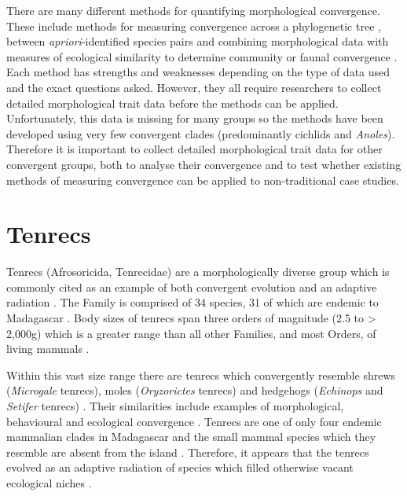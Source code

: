 	There are many different methods for quantifying morphological convergence. These include methods for measuring convergence across a phylogenetic tree \citep{Stayton2008}, between \textit{apriori}-identified species pairs \citep{Arbuckle2014, Muschick2012, Stayton2006} and combining morphological data with measures of ecological similarity to determine community or faunal convergence \citep{Ingram2013, Mahler2013, Moen2013, Melville2006}. Each method has strengths and weaknesses depending on the type of data used and the exact questions asked. However, they all require researchers to collect detailed morphological trait data before the methods can be applied. Unfortunately, this data is missing for many groups so the methods have been developed using very few convergent clades (predominantly cichlids and \textit{Anoles}). Therefore it is important to collect detailed morphological trait data for other convergent groups, both to analyse their convergence and to test whether existing methods of measuring convergence can be applied to non-traditional case studies.
\section{Tenrecs}
	Tenrecs (Afrosoricida, Tenrecidae) are a morphologically diverse group which is commonly cited as an example of both convergent evolution and an adaptive radiation \citep{Soarimalala2011, Eisenberg1969}. The Family is comprised of 34 species, 31 of which are endemic to Madagascar \citep{Olson2013}. Body sizes of tenrecs span three orders of magnitude (2.5 to > 2,000g) which is a greater range than all other Families, and most Orders, of living mammals \citep{Olson2003}.
	
	Within this vast size range there are tenrecs which convergently resemble shrews (\textit{Microgale} tenrecs), moles (\textit{Oryzorictes} tenrecs) and hedgehogs (\textit{Echinops} and \textit{Setifer} tenrecs) \citep{Eisenberg1969}. Their similarities include examples of morphological, behavioural and ecological convergence \citep{Soarimalala2011}. Tenrecs are one of only four endemic mammalian clades in Madagascar and the small mammal species which they resemble are absent from the island \citep{Garbutt1999}. Therefore, it appears that the tenrecs evolved as an adaptive radiation of species which filled otherwise vacant ecological niches \citep{Soarimalala2011}.

